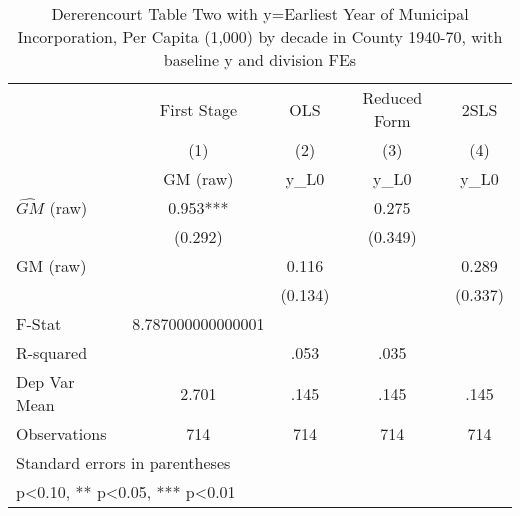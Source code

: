 \begin{table}[htbp]\centering
\def\sym#1{\ifmmode^{#1}\else\(^{#1}\)\fi}
\caption{Dererencourt Table Two with y=Earliest Year of Municipal Incorporation, Per Capita (1,000) by decade in County 1940-70, with baseline y and division FEs}
\begin{tabular}{l*{4}{c}}
\toprule
                    & First Stage   &         OLS   &Reduced Form   &        2SLS   \\
                    &\multicolumn{1}{c}{(1)}&\multicolumn{1}{c}{(2)}&\multicolumn{1}{c}{(3)}&\multicolumn{1}{c}{(4)}\\
                    &\multicolumn{1}{c}{GM  (raw)}&\multicolumn{1}{c}{y\_L0}&\multicolumn{1}{c}{y\_L0}&\multicolumn{1}{c}{y\_L0}\\
\midrule
$\hat{GM}$ (raw)    &       0.953***&               &       0.275   &               \\
                    &     (0.292)   &               &     (0.349)   &               \\
\addlinespace
GM  (raw)           &               &       0.116   &               &       0.289   \\
                    &               &     (0.134)   &               &     (0.337)   \\
\midrule
F-Stat              &8.787000000000001   &               &               &               \\
R-squared           &               &        .053   &        .035   &               \\
Dep Var Mean        &       2.701   &        .145   &        .145   &        .145   \\
Observations        &         714   &         714   &         714   &         714   \\
\bottomrule
\multicolumn{5}{l}{\footnotesize Standard errors in parentheses}\\
\multicolumn{5}{l}{\footnotesize * p<0.10, ** p<0.05, *** p<0.01}\\
\end{tabular}
\end{table}

